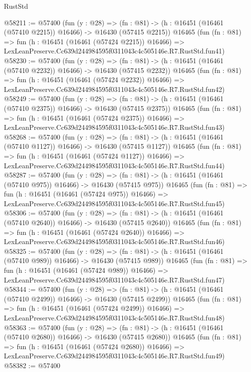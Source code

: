 \begin{lexlean}{RustStd}
\begin{coremodule}
@58211 := @57400
    (fun (y : @28) =>
    (fn : @81) -> (h : @16451 (@16461 (@57410 @2215)) @16466) -> @16430 (@57415 @2215))
    @16465
    (fun (fn : @81) =>
    fun (h : @16451 (@16461 (@57424 @2215)) @16466) =>
    LexLeanPreserve.Cc639d244984595f0311043c4c505146e.R7.RustStd.fun41)
@58230 := @57400
    (fun (y : @28) =>
    (fn : @81) -> (h : @16451 (@16461 (@57410 @2232)) @16466) -> @16430 (@57415 @2232))
    @16465
    (fun (fn : @81) =>
    fun (h : @16451 (@16461 (@57424 @2232)) @16466) =>
    LexLeanPreserve.Cc639d244984595f0311043c4c505146e.R7.RustStd.fun42)
@58249 := @57400
    (fun (y : @28) =>
    (fn : @81) -> (h : @16451 (@16461 (@57410 @2375)) @16466) -> @16430 (@57415 @2375))
    @16465
    (fun (fn : @81) =>
    fun (h : @16451 (@16461 (@57424 @2375)) @16466) =>
    LexLeanPreserve.Cc639d244984595f0311043c4c505146e.R7.RustStd.fun43)
@58268 := @57400
    (fun (y : @28) =>
    (fn : @81) -> (h : @16451 (@16461 (@57410 @1127)) @16466) -> @16430 (@57415 @1127))
    @16465
    (fun (fn : @81) =>
    fun (h : @16451 (@16461 (@57424 @1127)) @16466) =>
    LexLeanPreserve.Cc639d244984595f0311043c4c505146e.R7.RustStd.fun44)
@58287 := @57400
    (fun (y : @28) =>
    (fn : @81) -> (h : @16451 (@16461 (@57410 @975)) @16466) -> @16430 (@57415 @975))
    @16465
    (fun (fn : @81) =>
    fun (h : @16451 (@16461 (@57424 @975)) @16466) =>
    LexLeanPreserve.Cc639d244984595f0311043c4c505146e.R7.RustStd.fun45)
@58306 := @57400
    (fun (y : @28) =>
    (fn : @81) -> (h : @16451 (@16461 (@57410 @2640)) @16466) -> @16430 (@57415 @2640))
    @16465
    (fun (fn : @81) =>
    fun (h : @16451 (@16461 (@57424 @2640)) @16466) =>
    LexLeanPreserve.Cc639d244984595f0311043c4c505146e.R7.RustStd.fun46)
@58325 := @57400
    (fun (y : @28) =>
    (fn : @81) -> (h : @16451 (@16461 (@57410 @989)) @16466) -> @16430 (@57415 @989))
    @16465
    (fun (fn : @81) =>
    fun (h : @16451 (@16461 (@57424 @989)) @16466) =>
    LexLeanPreserve.Cc639d244984595f0311043c4c505146e.R7.RustStd.fun47)
@58344 := @57400
    (fun (y : @28) =>
    (fn : @81) -> (h : @16451 (@16461 (@57410 @2499)) @16466) -> @16430 (@57415 @2499))
    @16465
    (fun (fn : @81) =>
    fun (h : @16451 (@16461 (@57424 @2499)) @16466) =>
    LexLeanPreserve.Cc639d244984595f0311043c4c505146e.R7.RustStd.fun48)
@58363 := @57400
    (fun (y : @28) =>
    (fn : @81) -> (h : @16451 (@16461 (@57410 @2680)) @16466) -> @16430 (@57415 @2680))
    @16465
    (fun (fn : @81) =>
    fun (h : @16451 (@16461 (@57424 @2680)) @16466) =>
    LexLeanPreserve.Cc639d244984595f0311043c4c505146e.R7.RustStd.fun49)
@58382 := @57400

\end{coremodule}
\end{lexlean}
